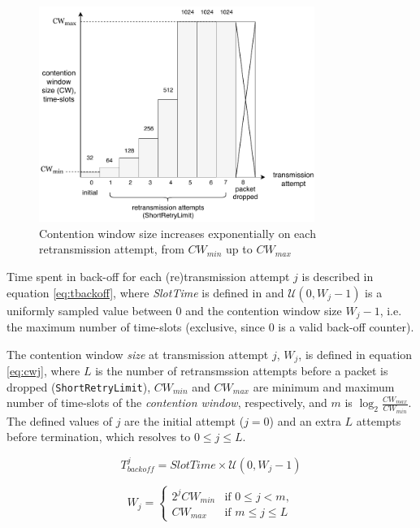 \begin{figure}
\center
\includegraphics[width=0.8\textwidth]{images/contention-window-sizes.pdf}
\caption{Contention window size increases exponentially on each retransmission attempt, from $\mathit{CW}_{min}$ up to $\mathit{CW}_{max}$}
\label{fig:cwsizes}
\end{figure}

Time spent in back-off for each (re)transmission attempt $j$ is described in
equation \ref{eq:tbackoff}, where \emph{SlotTime} is defined in \cite{654749}
and $\mathcal{U}(0,W_j-1)$ is a uniformly sampled value between $0$ and the
contention window size $W_{j}-1$, i.e. the maximum number of time-slots
(exclusive, since 0 is a valid back-off counter). 

The contention window \emph{size} at transmission attempt $j$, $W_{j}$, is
defined in equation \ref{eq:cwj}, where $L$ is the number of retransmssion
attempts before a packet is dropped (\texttt{ShortRetryLimit}),
$\mathit{CW}_{min}$ and $\mathit{CW}_{max}$ are minimum and maximum number of
time-slots of the \emph{contention window}, respectively, and $m$ is $\log_2
\frac{\mathit{CW}_{max}}{\mathit{CW}_{min}}$. The defined values of $j$ are
the initial attempt ($j=0$) and an extra $L$ attempts before termination,
which resolves to $0 \leq j \leq L$.

\begin{equation} \label{eq:tbackoff}
T^j_{\mathit{backoff}} = \mathit{SlotTime} \times \mathcal{U}(0,W_j-1)
\end{equation}

\begin{equation} \label{eq:cwj}
W_j = \left\{
	\begin{array}{ll}
		2^j \mathit{CW}_{min}  & \mbox{if } 0 \leq j < m, \\
		\mathit{CW}_{max}      & \mbox{if } m \leq j \leq L
	\end{array}
\right.
\end{equation}

